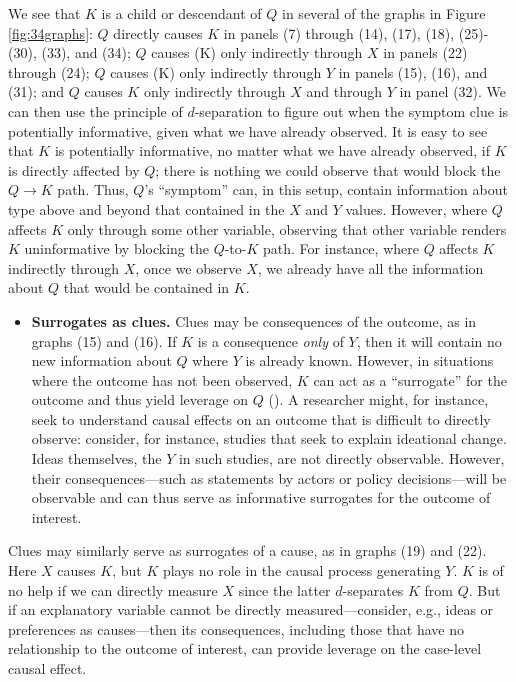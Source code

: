 \documentclass[
  12pt,
]{book}
\providecommand{\tightlist}{%
  \setlength{\itemsep}{0pt}\setlength{\parskip}{0pt}}
\begin{document}
We see that \(K\) is a child or descendant of \(Q\) in several of the graphs in Figure \ref{fig:34graphs}: \(Q\) directly causes \(K\) in panels (7) through (14), (17), (18), (25)-(30), (33), and (34); \(Q\) causes (K) only indirectly through \(X\) in panels (22) through (24); \(Q\) causes (K) only indirectly through \(Y\) in panels (15), (16), and (31); and \(Q\) causes \(K\) only indirectly through \(X\) and through \(Y\) in panel (32). We can then use the principle of \(d\)-separation to figure out when the symptom clue is potentially informative, given what we have already observed. It is easy to see that \(K\) is potentially informative, no matter what we have already observed, if \(K\) is directly affected by \(Q\); there is nothing we could observe that would block the \(Q \rightarrow K\) path. Thus, \(Q\)'s ``symptom'' can, in this setup, contain information about type above and beyond that contained in the \(X\) and \(Y\) values. However, where \(Q\) affects \(K\) only through some other variable, observing that other variable renders \(K\) uninformative by blocking the \(Q\)-to-\(K\) path. For instance, where \(Q\) affects \(K\) indirectly through \(X\), once we observe \(X\), we already have all the information about \(Q\) that would be contained in \(K\).

\begin{itemize}
\tightlist
\item
  \textbf{Surrogates as clues.} Clues may be consequences of the outcome, as in graphs (15) and (16). If \(K\) is a consequence \emph{only} of \(Y\), then it will contain no new information about \(Q\) where \(Y\) is already known. However, in situations where the outcome has not been observed, \(K\) can act as a ``surrogate'' for the outcome and thus yield leverage on \(Q\) (\citet{frangakis2002principal}). A researcher might, for instance, seek to understand causal effects on an outcome that is difficult to directly observe: consider, for instance, studies that seek to explain ideational change. Ideas themselves, the \(Y\) in such studies, are not directly observable. However, their consequences---such as statements by actors or policy decisions---will be observable and can thus serve as informative surrogates for the outcome of interest.
\end{itemize}

Clues may similarly serve as surrogates of a cause, as in graphs (19) and (22). Here \(X\) causes \(K\), but \(K\) plays no role in the causal process generating \(Y\). \(K\) is of no help if we can directly measure \(X\) since the latter \(d\)-separates \(K\) from \(Q\). But if an explanatory variable cannot be directly measured---consider, e.g., ideas or preferences as causes---then its consequences, including those that have no relationship to the outcome of interest, can provide leverage on the case-level causal effect.
\end{document}
